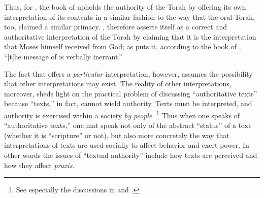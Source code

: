\noindent
Thus, for \vanderkam, the book of \jub upholds the authority of the Torah by offering its own interpretation of its contents in a similar fashion to the way that the oral Torah, too, claimed a similar primacy. \jub, therefore asserts itself as a correct and authoritative interpretation of the Torah by claiming that it is the interpretation that Moses himself received from God; as \vanderkam puts it, according to the book of \jub, ``[t]he message of \jub is verbally inerrant.''\autocite[33]{vanderkam_metso-etal2010}

The fact that \jub offers a \emph{particular} interpretation, however, assumes the possibility that other interpretations may exist. The reality of other interpretations, moreover, sheds light on the practical problem of discussing ``authoritative texts'' because ``texts,'' in fact, cannot wield authority. Texts must be interpreted, and authority is exercised within a society \emph{by people}.%
    \footnote{See especially the discussions in \cite[475]{debel_jsj2014} and \cite{brooke_rev-qumran2012}.}
Thus when one speaks of ``authoritative texts,'' one mat speak not only of the abstract ``status'' of a text (whether it is ``scripture'' or not), but also more concretely the way that interpretations of texts are used socially to affect behavior and exert power.\autocite{foucault_ci1982} In other words the issues of ``textual authority'' include how texts are perceived and how they affect \emph{praxis}.

